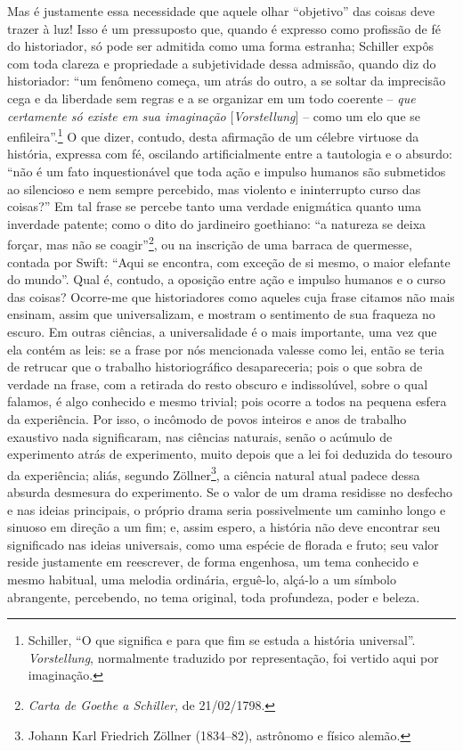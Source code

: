 Mas é justamente essa necessidade que aquele olhar ``objetivo'' das
coisas deve trazer à luz! Isso é um pressuposto que, quando é expresso
como profissão de fé do historiador, só pode ser admitida como uma forma
estranha; Schiller expôs com toda clareza e propriedade a subjetividade
dessa admissão, quando diz do historiador: ``um fenômeno começa, um
atrás do outro, a se soltar da imprecisão cega e da liberdade sem regras
e a se organizar em um todo coerente -- \emph{que certamente só existe
em sua imaginação} {[}\emph{Vorstellung}{]} -- como um elo que se
enfileira''.\footnote{Schiller, ``O que significa e para que fim se
  estuda a história universal''. \emph{Vorstellung}, normalmente
  traduzido por representação, foi vertido aqui por imaginação.} O que
dizer, contudo, desta afirmação de um célebre virtuose da história,
expressa com fé, oscilando artificialmente entre a tautologia e o
absurdo: ``não é um fato inquestionável que toda ação e impulso humanos
são submetidos ao silencioso e nem sempre percebido, mas violento e
ininterrupto curso das coisas?'' Em tal frase se percebe tanto uma
verdade enigmática quanto uma inverdade patente; como o dito do
jardineiro goethiano: ``a natureza se deixa forçar, mas não se
coagir''\footnote{\emph{Carta de Goethe a Schiller,} de 21/02/1798.}, ou na
inscrição de uma barraca de quermesse, contada por Swift: ``Aqui se
encontra, com exceção de si mesmo, o maior elefante do mundo''. Qual é,
contudo, a oposição entre ação e impulso humanos e o curso das coisas?
Ocorre-me que historiadores como aqueles cuja frase citamos não mais
ensinam, assim que universalizam, e mostram o sentimento de sua fraqueza
no escuro. Em outras ciências, a universalidade é o mais importante, uma
vez que ela contém as leis: se a frase por nós mencionada valesse como
lei, então se teria de retrucar que o trabalho historiográfico
desapareceria; pois o que sobra de verdade na frase, com a retirada do
resto obscuro e indissolúvel, sobre o qual falamos, é algo conhecido e
mesmo trivial; pois ocorre a todos na pequena esfera da experiência. Por
isso, o incômodo de povos inteiros e anos de trabalho exaustivo nada
significaram, nas ciências naturais, senão o acúmulo de experimento
atrás de experimento, muito depois que a lei foi deduzida do tesouro da
experiência; aliás, segundo Zöllner\footnote{Johann Karl Friedrich
  Zöllner (1834--82), astrônomo e físico alemão.}, a ciência natural
atual padece dessa absurda desmesura do experimento. Se o valor de um
drama residisse no desfecho e nas ideias principais, o próprio drama
seria possivelmente um caminho longo e sinuoso em direção a um fim; e,
assim espero, a história não deve encontrar seu significado nas ideias
universais, como uma espécie de florada e fruto; seu valor reside
justamente em reescrever, de forma engenhosa, um tema conhecido e mesmo
habitual, uma melodia ordinária, erguê-lo, alçá-lo a um símbolo
abrangente, percebendo, no tema original, toda profundeza, poder e
beleza.

